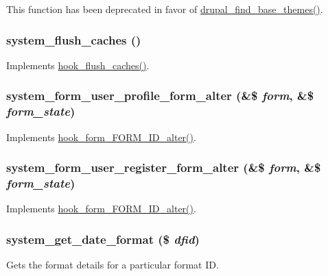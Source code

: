 This function has been deprecated in favor of \hyperlink{includes_2theme_8inc_ab9b1b3016f42a43d21096d650ffe7ec1}{drupal\_\-find\_\-base\_\-themes()}. \hypertarget{system_8module_ae38c371e6c9eba87278d135ad16c9d33}{
\subsubsection[{system\_\-flush\_\-caches}]{\setlength{\rightskip}{0pt plus 5cm}system\_\-flush\_\-caches ()}}
\label{system_8module_ae38c371e6c9eba87278d135ad16c9d33}
Implements \hyperlink{group__hooks_ga66531e6e564157b7ca45ed07549c9b97}{hook\_\-flush\_\-caches()}. \hypertarget{system_8module_ae5d1fb61b3099b07f38b7a328eea59a9}{
\subsubsection[{system\_\-form\_\-user\_\-profile\_\-form\_\-alter}]{\setlength{\rightskip}{0pt plus 5cm}system\_\-form\_\-user\_\-profile\_\-form\_\-alter (\&\$ {\em form}, \/  \&\$ {\em form\_\-state})}}
\label{system_8module_ae5d1fb61b3099b07f38b7a328eea59a9}
Implements \hyperlink{group__hooks_ga8d4a4089551493d55911bd5c4f218264}{hook\_\-form\_\-FORM\_\-ID\_\-alter()}. \hypertarget{system_8module_ad535a7c29e92dc0394103a6ea1de3886}{
\subsubsection[{system\_\-form\_\-user\_\-register\_\-form\_\-alter}]{\setlength{\rightskip}{0pt plus 5cm}system\_\-form\_\-user\_\-register\_\-form\_\-alter (\&\$ {\em form}, \/  \&\$ {\em form\_\-state})}}
\label{system_8module_ad535a7c29e92dc0394103a6ea1de3886}
Implements \hyperlink{group__hooks_ga8d4a4089551493d55911bd5c4f218264}{hook\_\-form\_\-FORM\_\-ID\_\-alter()}. \hypertarget{system_8module_ad950accb99d110fbe6bfc92b967440aa}{
\subsubsection[{system\_\-get\_\-date\_\-format}]{\setlength{\rightskip}{0pt plus 5cm}system\_\-get\_\-date\_\-format (\$ {\em dfid})}}
\label{system_8module_ad950accb99d110fbe6bfc92b967440aa}
Gets the format details for a particular format ID.


